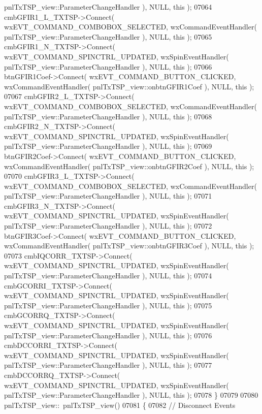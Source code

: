 \begin{DoxyCode}
      pnlTxTSP_view::ParameterChangeHandler ), NULL, \textcolor{keyword}{this} );
07064     cmbGFIR1_L_TXTSP->Connect( wxEVT\_COMMAND\_COMBOBOX\_SELECTED, wxCommandEventHandler( 
      pnlTxTSP_view::ParameterChangeHandler ), NULL, \textcolor{keyword}{this} );
07065     cmbGFIR1_N_TXTSP->Connect( wxEVT\_COMMAND\_SPINCTRL\_UPDATED, wxSpinEventHandler( 
      pnlTxTSP_view::ParameterChangeHandler ), NULL, \textcolor{keyword}{this} );
07066     btnGFIR1Coef->Connect( wxEVT\_COMMAND\_BUTTON\_CLICKED, wxCommandEventHandler( 
      pnlTxTSP_view::onbtnGFIR1Coef ), NULL, \textcolor{keyword}{this} );
07067     cmbGFIR2_L_TXTSP->Connect( wxEVT\_COMMAND\_COMBOBOX\_SELECTED, wxCommandEventHandler( 
      pnlTxTSP_view::ParameterChangeHandler ), NULL, \textcolor{keyword}{this} );
07068     cmbGFIR2_N_TXTSP->Connect( wxEVT\_COMMAND\_SPINCTRL\_UPDATED, wxSpinEventHandler( 
      pnlTxTSP_view::ParameterChangeHandler ), NULL, \textcolor{keyword}{this} );
07069     btnGFIR2Coef->Connect( wxEVT\_COMMAND\_BUTTON\_CLICKED, wxCommandEventHandler( 
      pnlTxTSP_view::onbtnGFIR2Coef ), NULL, \textcolor{keyword}{this} );
07070     cmbGFIR3_L_TXTSP->Connect( wxEVT\_COMMAND\_COMBOBOX\_SELECTED, wxCommandEventHandler( 
      pnlTxTSP_view::ParameterChangeHandler ), NULL, \textcolor{keyword}{this} );
07071     cmbGFIR3_N_TXTSP->Connect( wxEVT\_COMMAND\_SPINCTRL\_UPDATED, wxSpinEventHandler( 
      pnlTxTSP_view::ParameterChangeHandler ), NULL, \textcolor{keyword}{this} );
07072     btnGFIR3Coef->Connect( wxEVT\_COMMAND\_BUTTON\_CLICKED, wxCommandEventHandler( 
      pnlTxTSP_view::onbtnGFIR3Coef ), NULL, \textcolor{keyword}{this} );
07073     cmbIQCORR_TXTSP->Connect( wxEVT\_COMMAND\_SPINCTRL\_UPDATED, wxSpinEventHandler( 
      pnlTxTSP_view::ParameterChangeHandler ), NULL, \textcolor{keyword}{this} );
07074     cmbGCORRI_TXTSP->Connect( wxEVT\_COMMAND\_SPINCTRL\_UPDATED, wxSpinEventHandler( 
      pnlTxTSP_view::ParameterChangeHandler ), NULL, \textcolor{keyword}{this} );
07075     cmbGCORRQ_TXTSP->Connect( wxEVT\_COMMAND\_SPINCTRL\_UPDATED, wxSpinEventHandler( 
      pnlTxTSP_view::ParameterChangeHandler ), NULL, \textcolor{keyword}{this} );
07076     cmbDCCORRI_TXTSP->Connect( wxEVT\_COMMAND\_SPINCTRL\_UPDATED, wxSpinEventHandler( 
      pnlTxTSP_view::ParameterChangeHandler ), NULL, \textcolor{keyword}{this} );
07077     cmbDCCORRQ_TXTSP->Connect( wxEVT\_COMMAND\_SPINCTRL\_UPDATED, wxSpinEventHandler( 
      pnlTxTSP_view::ParameterChangeHandler ), NULL, \textcolor{keyword}{this} );
07078 \}
07079 
07080 pnlTxTSP_view::~pnlTxTSP_view()
07081 \{
07082     \textcolor{comment}{// Disconnect Events}

\end{DoxyCode}
